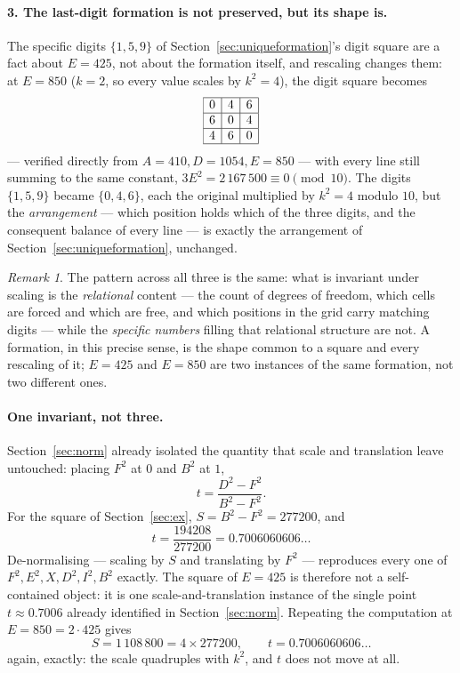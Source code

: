 \documentclass[12pt]{article}
\theoremstyle{remark}
\newtheorem{remark}[theorem]{Remark}
\begin{document}
\paragraph{3. The last-digit formation is not preserved, but its shape is.}
The specific digits $\{1,5,9\}$ of Section~\ref{sec:uniqueformation}'s
digit square are a fact about $E=425$, not about the formation itself,
and rescaling changes them: at $E=850$ ($k=2$, so every value scales
by $k^2=4$), the digit square becomes
\[
\begin{array}{|c|c|c|}
\hline 0 & 4 & 6 \\ \hline 6 & 0 & 4 \\ \hline 4 & 6 & 0 \\ \hline
\end{array}
\]
--- verified directly from $A=410,D=1054,E=850$ --- with every line
still summing to the same constant, $3E^2=2\,167\,500\equiv0
\pmod{10}$. The digits $\{1,5,9\}$ became $\{0,4,6\}$, each the
original multiplied by $k^2=4$ modulo $10$, but the \emph{arrangement}
--- which position holds which of the three digits, and the
consequent balance of every line --- is exactly the arrangement of
Section~\ref{sec:uniqueformation}, unchanged.

\begin{remark}
The pattern across all three is the same: what is invariant under
scaling is the \emph{relational} content --- the count of degrees of
freedom, which cells are forced and which are free, and which
positions in the grid carry matching digits --- while the
\emph{specific numbers} filling that relational structure are not. A
formation, in this precise sense, is the shape common to a square and
every rescaling of it; $E=425$ and $E=850$ are two instances of the
same formation, not two different ones.
\end{remark}

\sloppy
\paragraph{One invariant, not three.}
Section~\ref{sec:norm} already isolated the quantity that scale and
translation leave untouched: placing $F^2$ at $0$ and $B^2$ at $1$,
\[
t = \frac{D^2-F^2}{B^2-F^2} .
\]
For the square of Section~\ref{sec:ex}, $S=B^2-F^2=277200$, and
\[
t = \frac{194208}{277200} = 0.7006060606\ldots
\]
De-normalising --- scaling by $S$ and translating by $F^2$ ---
reproduces every one of
$F^2,E^2,X,D^2,I^2,B^2$ exactly. The square of $E=425$ is therefore
not a self-contained object: it is one scale-and-translation instance
of the single point $t\approx0.7006$ already identified in
Section~\ref{sec:norm}. Repeating the computation at
$E=850=2\cdot425$ gives
\[
S = 1\,108\,800 = 4\times277200, \qquad t = 0.7006060606\ldots
\]
again, exactly: the scale quadruples with $k^2$, and $t$ does not
move at all.
\fussy
\end{document}
